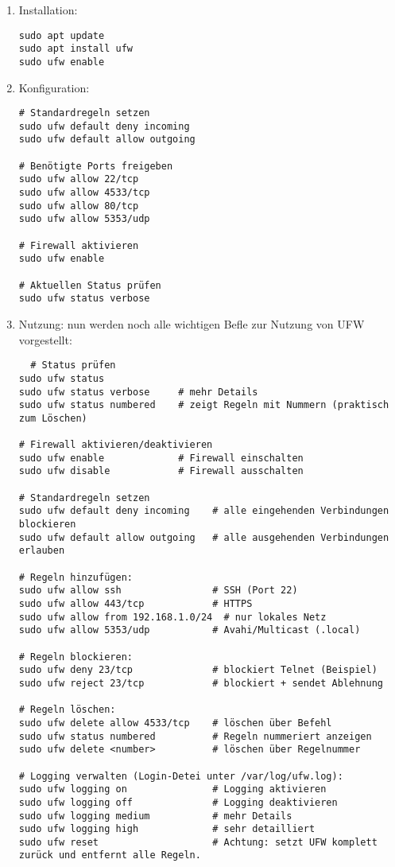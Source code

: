 \documentclass[12pt,a4paper]{report}
\begin{document}
  \begin{enumerate}
    \item Installation:
    \begin{verbatim}
sudo apt update
sudo apt install ufw
sudo ufw enable
    \end{verbatim}

    \item Konfiguration:
    \begin{verbatim}
# Standardregeln setzen
sudo ufw default deny incoming
sudo ufw default allow outgoing

# Benötigte Ports freigeben
sudo ufw allow 22/tcp
sudo ufw allow 4533/tcp
sudo ufw allow 80/tcp
sudo ufw allow 5353/udp

# Firewall aktivieren
sudo ufw enable

# Aktuellen Status prüfen
sudo ufw status verbose
    \end{verbatim}

    \item Nutzung:
    nun werden noch alle wichtigen Befle zur Nutzung von \ac{UFW} vorgestellt:
    \begin{verbatim}
  # Status prüfen
sudo ufw status
sudo ufw status verbose     # mehr Details
sudo ufw status numbered    # zeigt Regeln mit Nummern (praktisch zum Löschen)

# Firewall aktivieren/deaktivieren
sudo ufw enable             # Firewall einschalten
sudo ufw disable            # Firewall ausschalten

# Standardregeln setzen
sudo ufw default deny incoming    # alle eingehenden Verbindungen blockieren
sudo ufw default allow outgoing   # alle ausgehenden Verbindungen erlauben

# Regeln hinzufügen:
sudo ufw allow ssh                # SSH (Port 22)
sudo ufw allow 443/tcp            # HTTPS
sudo ufw allow from 192.168.1.0/24  # nur lokales Netz
sudo ufw allow 5353/udp           # Avahi/Multicast (.local)

# Regeln blockieren:
sudo ufw deny 23/tcp              # blockiert Telnet (Beispiel)
sudo ufw reject 23/tcp            # blockiert + sendet Ablehnung

# Regeln löschen:
sudo ufw delete allow 4533/tcp    # löschen über Befehl
sudo ufw status numbered          # Regeln nummeriert anzeigen
sudo ufw delete <number>          # löschen über Regelnummer

# Logging verwalten (Login-Detei unter /var/log/ufw.log):
sudo ufw logging on               # Logging aktivieren
sudo ufw logging off              # Logging deaktivieren
sudo ufw logging medium           # mehr Details
sudo ufw logging high             # sehr detailliert
sudo ufw reset                    # Achtung: setzt UFW komplett zurück und entfernt alle Regeln.
    \end{verbatim}
  \end{enumerate}
\end{document}
